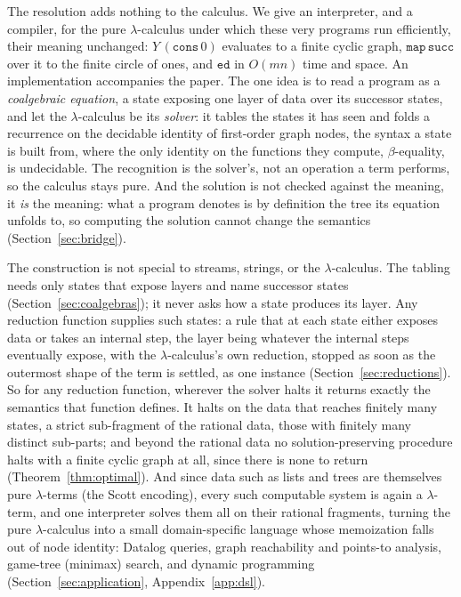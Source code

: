 The resolution adds nothing to the calculus. We give an interpreter, and a compiler, for the
pure $\lambda$-calculus under which these very programs run efficiently, their meaning unchanged:
$Y\,(\mathtt{cons}\,0)$ evaluates to a finite cyclic graph, $\mathtt{map}\,\mathtt{succ}$ over it
to the finite circle of ones, and $\mathtt{ed}$ in $O(mn)$ time and space. An implementation
accompanies the paper. The one idea is to read a
program as a \emph{coalgebraic equation}, a state exposing one
layer of data over its successor states, and let the $\lambda$-calculus be its \emph{solver}: it
tables the states it has seen and folds a recurrence on the decidable identity of first-order
graph nodes, the syntax a state is built from, where the only identity on the functions they
compute, $\beta$-equality, is undecidable. The recognition is the solver's, not an operation a
term performs, so the calculus stays pure. And the solution is not checked against the meaning,
it \emph{is} the meaning: what a program denotes is by definition the tree its equation unfolds
to, so computing the solution cannot change the semantics (Section~\ref{sec:bridge}).

The construction is not special to streams, strings, or the $\lambda$-calculus. The tabling
needs only states that expose layers and name successor states (Section~\ref{sec:coalgebras});
it never asks how a state produces its layer. Any reduction function supplies such states: a
rule that at each state either exposes data or takes an internal step, the layer being whatever
the internal steps eventually expose, with the $\lambda$-calculus's own reduction, stopped as
soon as the outermost shape of the term is settled, as one instance
(Section~\ref{sec:reductions}). So for any reduction
function, wherever the solver halts it returns exactly the semantics that function defines. It
halts on the data that reaches finitely many states, a strict sub-fragment of the rational data,
those with finitely many distinct sub-parts; and beyond the rational data no solution-preserving
procedure halts with a finite cyclic graph at all, since there is none to return
(Theorem~\ref{thm:optimal}). And since data such as lists and trees are themselves pure
$\lambda$-terms (the Scott encoding), every such computable system is again a $\lambda$-term, and
one interpreter solves them all on their rational fragments, turning the pure $\lambda$-calculus into a small domain-specific
language whose memoization falls out of node identity: Datalog queries, graph reachability and
points-to analysis, game-tree (minimax) search, and dynamic programming
(Section~\ref{sec:application}, Appendix~\ref{app:dsl}).

